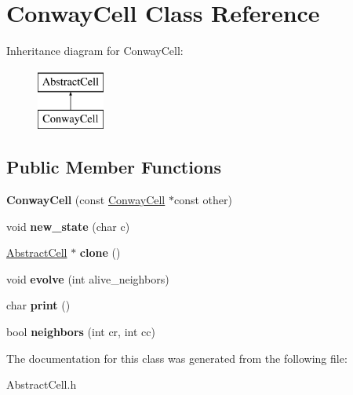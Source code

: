 \hypertarget{classConwayCell}{\section{\-Conway\-Cell \-Class \-Reference}
\label{classConwayCell}
}
\-Inheritance diagram for \-Conway\-Cell\-:\begin{figure}[H]
\begin{center}
\leavevmode
\includegraphics[height=2.000000cm]{classConwayCell}
\end{center}
\end{figure}
\subsection*{\-Public \-Member \-Functions}
\begin{DoxyCompactItemize}
\item 
\hypertarget{classConwayCell_a6ead6019a95d5222586185e537d4919b}{{\bfseries \-Conway\-Cell} (const \hyperlink{classConwayCell}{\-Conway\-Cell} $\ast$const other)}\label{classConwayCell_a6ead6019a95d5222586185e537d4919b}

\item 
\hypertarget{classConwayCell_a9904f42b6ac68afe0fa5fb258f6181f0}{void {\bfseries new\-\_\-state} (char c)}\label{classConwayCell_a9904f42b6ac68afe0fa5fb258f6181f0}

\item 
\hypertarget{classConwayCell_a7bd8d9a43a4844cc88ac98c2e5416cd1}{\hyperlink{classAbstractCell}{\-Abstract\-Cell} $\ast$ {\bfseries clone} ()}\label{classConwayCell_a7bd8d9a43a4844cc88ac98c2e5416cd1}

\item 
\hypertarget{classConwayCell_a0161e193065689e13829c58c8a6a7de2}{void {\bfseries evolve} (int alive\-\_\-neighbors)}\label{classConwayCell_a0161e193065689e13829c58c8a6a7de2}

\item 
\hypertarget{classConwayCell_aec174e7cc0eb43aab94a37034f62a20c}{char {\bfseries print} ()}\label{classConwayCell_aec174e7cc0eb43aab94a37034f62a20c}

\item 
\hypertarget{classConwayCell_ad6ac60145c61ad352c1a0f56f21ba262}{bool {\bfseries neighbors} (int cr, int cc)}\label{classConwayCell_ad6ac60145c61ad352c1a0f56f21ba262}

\end{DoxyCompactItemize}


\-The documentation for this class was generated from the following file\-:\begin{DoxyCompactItemize}
\item 
\-Abstract\-Cell.\-h\end{DoxyCompactItemize}
